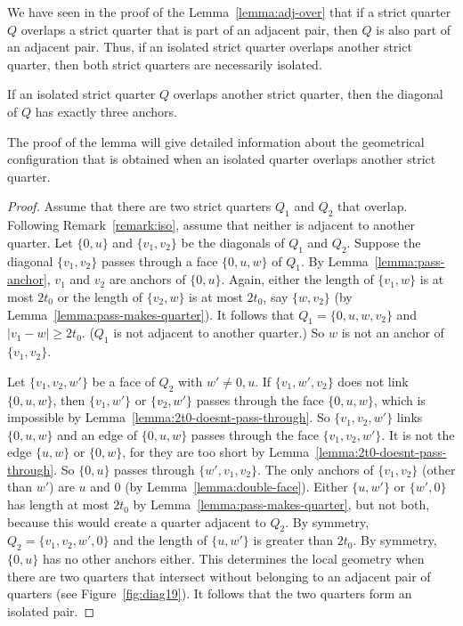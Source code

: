 \begin{remark}\label{remark:iso}
We have seen in the proof of the Lemma~\ref{lemma:adj-over} that
if a strict quarter $Q$ overlaps a strict quarter that is part of
an adjacent pair, then $Q$ is also part of an adjacent pair. Thus,
if an isolated strict quarter overlaps another strict quarter,
then both strict quarters are necessarily isolated.
\end{remark}

\begin{lemma}\label{lemma:iso-over}
If an isolated strict quarter $Q$ overlaps another strict quarter,
then the diagonal of $Q$ has exactly three anchors.
\end{lemma}

The proof of the lemma will give detailed information about the
geometrical configuration that is obtained when an isolated
quarter overlaps another strict quarter.

\begin{proof}  Assume that there are two strict quarters $Q_1$ and $Q_2$
that overlap.  Following Remark~\ref{remark:iso}, assume that
neither is adjacent to another quarter. Let $\{0,u\}$ and
$\{v_1,v_2\}$ be the diagonals of $Q_1$ and $Q_2$. Suppose the
diagonal $\{v_1,v_2\}$ passes through a face $\{0,u,w\}$ of $Q_1$.
By Lemma~\ref{lemma:pass-anchor}, $v_1$ and $v_2$ are anchors of
$\{0,u\}$. Again, either the length of $\{v_1,w\}$ is at most
$2t_0$ or the length of $\{v_2,w\}$ is at most $2t_0$, say
$\{w,v_2\}$ (by Lemma~\ref{lemma:pass-makes-quarter}). It follows
that
    $Q_1=\{0,u,w,v_2\}$ and $|v_1-w|\ge2t_0$.
($Q_1$ is not adjacent to another quarter.)  So $w$ is not an anchor of
$\{v_1,v_2\}$.

Let $\{v_1,v_2,w'\}$ be a face of $Q_2$ with $w'\ne 0,u$. If
$\{v_1,w',v_2\}$ does not link $\{0,u,w\}$, then $\{v_1,w'\}$ or
$\{v_2,w'\}$ passes through the face $\{0,u,w\}$, which is
impossible by Lemma~\ref{lemma:2t0-doesnt-pass-through}. So
$\{v_1,v_2,w'\}$  links $\{0,u,w\}$ and an edge of $\{0,u,w\}$
passes through the face $\{v_1,v_2,w'\}$. It is not the edge
$\{u,w\}$ or $\{0,w\}$, for they are too short by
Lemma~\ref{lemma:2t0-doesnt-pass-through}.  So $\{0,u\}$ passes
through $\{w',v_1,v_2\}$. The only anchors of $\{v_1,v_2\}$ (other
than $w'$) are $u$ and $0$ (by Lemma~\ref{lemma:double-face}).
Either $\{u,w'\}$ or $\{w',0\}$ has length at most $2t_0$ by
Lemma~\ref{lemma:pass-makes-quarter}, but not both, because this
would create a quarter adjacent to $Q_2$. By symmetry,
$Q_2=\{v_1,v_2,w',0\}$ and the length of $\{u,w'\}$ is greater
than $2t_0$. By symmetry, $\{0,u\}$ has no other anchors either.
This determines the local geometry when there are two quarters
that intersect without belonging to an adjacent pair of quarters
(see Figure~\ref{fig:diag19}).  It follows that the two quarters
form an isolated pair.
\end{proof}

